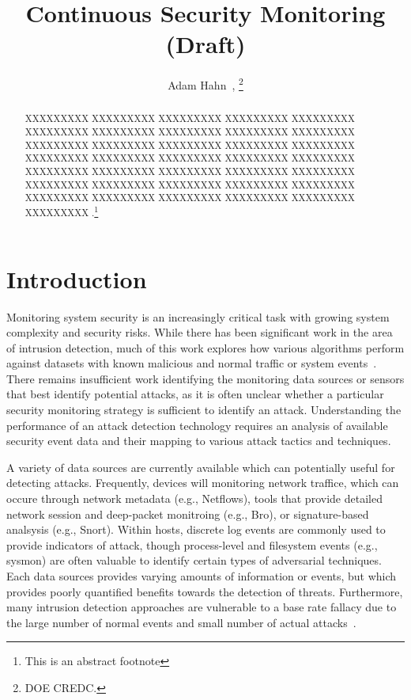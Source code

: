 \documentclass[journal]{IEEEtran}
\begin{document}
\title{Continuous Security Monitoring (Draft)}
\author{ Adam Hahn~, 	
\thanks{DOE CREDC.}%
}

\maketitle

\begin{abstract}
XXXXXXXXX XXXXXXXXX XXXXXXXXX XXXXXXXXX XXXXXXXXX XXXXXXXXX 
XXXXXXXXX XXXXXXXXX XXXXXXXXX XXXXXXXXX XXXXXXXXX XXXXXXXXX 
XXXXXXXXX XXXXXXXXX XXXXXXXXX XXXXXXXXX XXXXXXXXX XXXXXXXXX 
XXXXXXXXX XXXXXXXXX XXXXXXXXX XXXXXXXXX XXXXXXXXX XXXXXXXXX 
XXXXXXXXX XXXXXXXXX XXXXXXXXX XXXXXXXXX XXXXXXXXX XXXXXXXXX 
XXXXXXXXX XXXXXXXXX XXXXXXXXX XXXXXXXXX XXXXXXXXX XXXXXXXXX 
.\footnote{This is an abstract footnote}
\end{abstract}

\section{Introduction}
Monitoring system security is an increasingly critical task with growing system complexity and security risks. While there has been significant work in the area of intrusion detection, much of this work explores how various algorithms perform against datasets with known malicious and normal traffic or system events~\cite{4693640}. There remains insufficient work identifying the monitoring data sources or sensors that best identify potential attacks, as it is often unclear whether a particular security monitoring strategy is sufficient to identify an attack. Understanding the performance of an attack detection technology requires an analysis of available security event data and their mapping to various attack tactics and techniques. 

A variety of data sources are currently available which can potentially useful for detecting attacks. Frequently, devices will monitoring network traffice, which can occure through network metadata (e.g., Netflows), tools that provide detailed network session and deep-packet monitroing (e.g., Bro), or signature-based analsysis (e.g., Snort). Within hosts, discrete log events are commonly used to provide indicators of attack, though process-level and filesystem events (e.g., sysmon) are often valuable to identify certain types of adversarial techniques. Each data sources provides varying amounts of information or events, but which provides poorly quantified benefits towards the detection of threats. Furthermore, many intrusion detection approaches are vulnerable to a base rate fallacy due to the large number of normal events and small number of actual attacks~\cite{Axelsson}. 
\end{document}
